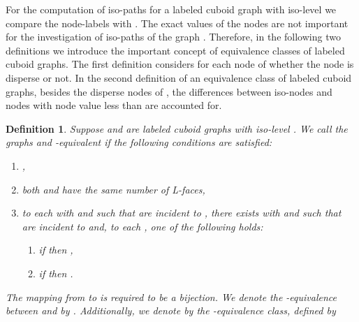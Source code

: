 \documentclass[a4paper,11pt]{article}
\newtheorem{definition}[theorem]{Definition}
\begin{document}
For the computation of iso-paths for a labeled cuboid graph  with iso-level 
we compare the node-labels with . The exact values of the nodes are not important for the
investigation of iso-paths of the graph . Therefore, in the following two definitions we introduce
the important concept of equivalence classes of labeled cuboid graphs. The first definition considers
for each node of  whether the node is disperse or not. In the second definition of an equivalence
class of labeled cuboid graphs, besides the disperse nodes of , the differences between iso-nodes
and nodes with node value less than  are accounted for.

\begin{definition}
Suppose  and  are labeled cuboid graphs with
iso-level . We call the graphs  and  -equivalent if the following conditions
are satisfied:
\begin{enumerate}
\item[(i)] ,
\item[(ii)] both  and  have the same number of L-faces,
\item[(iii)] to each  with  and  such that  are
incident to , there exists  with  and  such that
 are incident to  and, to each , one of the following holds:
  \begin{enumerate}
   \item[(a)] if  then ,
   \item[(b)] if  then .
  \end{enumerate}
\end{enumerate}
The mapping from  to  is required to be a bijection. We denote the -equivalence between 
and  by . Additionally, we denote by 
the -equivalence class, defined by

\label{def:equivalence-1}
\end{definition}
\end{document}
